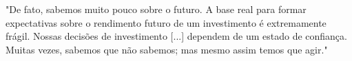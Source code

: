 \vspace*{\fill}
\begin{flushright}
	\parbox{0.5\textwidth}{ 
		"De fato, sabemos muito pouco sobre o futuro. A base real para formar expectativas sobre o rendimento futuro de um investimento é extremamente frágil. Nossas decisões de investimento [...] dependem de um estado de confiança. Muitas vezes, sabemos que não sabemos; mas mesmo assim temos que agir." 
	}
	
	\vspace{0.5cm} %
	
\end{flushright}